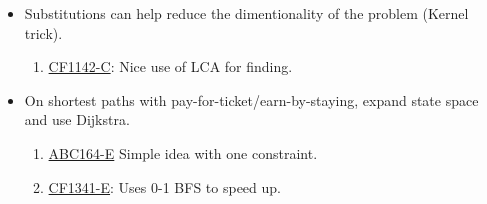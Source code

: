 \begin{itemize}
    \item Substitutions can help reduce the dimentionality of the problem (Kernel trick).
          \begin{enumerate}
              \item \href{https://codeforces.com/problemset/problem/1142/C}{CF1142-C}: Nice use of LCA for finding.
          \end{enumerate}
    \item On shortest paths with pay-for-ticket/earn-by-staying, expand state space and use Dijkstra.
          \begin{enumerate}
              \item \href{https://atcoder.jp/contests/abc164/tasks/abc164_e}{ABC164-E} Simple idea with one constraint.
              \item \href{https://codeforces.com/contest/1341/problem/E}{CF1341-E}: Uses 0-1 BFS to speed up.
          \end{enumerate}
\end{itemize}

